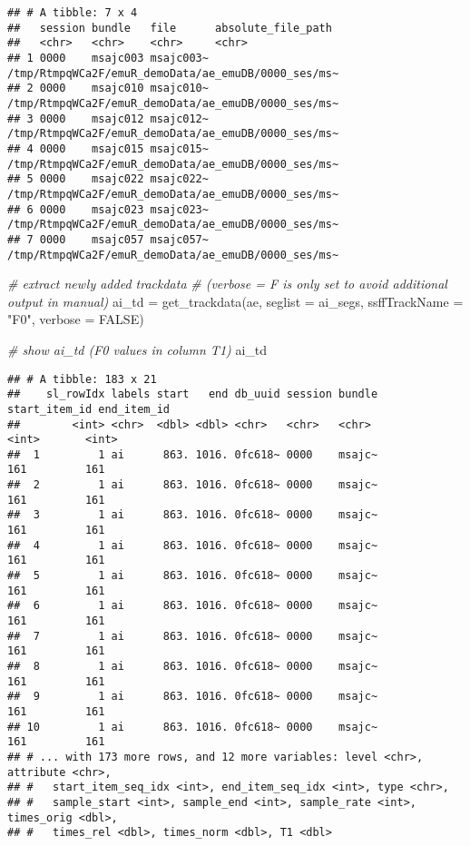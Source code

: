 \documentclass[
]{book}
\newenvironment{Shaded}{\begin{snugshade}}{\end{snugshade}}
\newcommand{\AttributeTok}[1]{\textcolor[rgb]{0.77,0.63,0.00}{#1}}
\newcommand{\CommentTok}[1]{\textcolor[rgb]{0.56,0.35,0.01}{\textit{#1}}}
\newcommand{\ConstantTok}[1]{\textcolor[rgb]{0.00,0.00,0.00}{#1}}
\newcommand{\FunctionTok}[1]{\textcolor[rgb]{0.00,0.00,0.00}{#1}}
\newcommand{\NormalTok}[1]{#1}
\newcommand{\OtherTok}[1]{\textcolor[rgb]{0.56,0.35,0.01}{#1}}
\newcommand{\StringTok}[1]{\textcolor[rgb]{0.31,0.60,0.02}{#1}}
\begin{document}
\begin{verbatim}
## # A tibble: 7 x 4
##   session bundle   file      absolute_file_path                                 
##   <chr>   <chr>    <chr>     <chr>                                              
## 1 0000    msajc003 msajc003~ /tmp/RtmpqWCa2F/emuR_demoData/ae_emuDB/0000_ses/ms~
## 2 0000    msajc010 msajc010~ /tmp/RtmpqWCa2F/emuR_demoData/ae_emuDB/0000_ses/ms~
## 3 0000    msajc012 msajc012~ /tmp/RtmpqWCa2F/emuR_demoData/ae_emuDB/0000_ses/ms~
## 4 0000    msajc015 msajc015~ /tmp/RtmpqWCa2F/emuR_demoData/ae_emuDB/0000_ses/ms~
## 5 0000    msajc022 msajc022~ /tmp/RtmpqWCa2F/emuR_demoData/ae_emuDB/0000_ses/ms~
## 6 0000    msajc023 msajc023~ /tmp/RtmpqWCa2F/emuR_demoData/ae_emuDB/0000_ses/ms~
## 7 0000    msajc057 msajc057~ /tmp/RtmpqWCa2F/emuR_demoData/ae_emuDB/0000_ses/ms~
\end{verbatim}

\begin{Shaded}
\begin{Highlighting}[]
\CommentTok{\# extract newly added trackdata}
\CommentTok{\# (verbose = F is only set to avoid additional output in manual)}
\NormalTok{ai\_td }\OtherTok{=} \FunctionTok{get\_trackdata}\NormalTok{(ae,}
                      \AttributeTok{seglist =}\NormalTok{ ai\_segs,}
                      \AttributeTok{ssffTrackName =} \StringTok{"F0"}\NormalTok{,}
                      \AttributeTok{verbose =} \ConstantTok{FALSE}\NormalTok{)}

\CommentTok{\# show ai\_td (F0 values in column T1)}
\NormalTok{ai\_td}
\end{Highlighting}
\end{Shaded}

\begin{verbatim}
## # A tibble: 183 x 21
##    sl_rowIdx labels start   end db_uuid session bundle start_item_id end_item_id
##        <int> <chr>  <dbl> <dbl> <chr>   <chr>   <chr>          <int>       <int>
##  1         1 ai      863. 1016. 0fc618~ 0000    msajc~           161         161
##  2         1 ai      863. 1016. 0fc618~ 0000    msajc~           161         161
##  3         1 ai      863. 1016. 0fc618~ 0000    msajc~           161         161
##  4         1 ai      863. 1016. 0fc618~ 0000    msajc~           161         161
##  5         1 ai      863. 1016. 0fc618~ 0000    msajc~           161         161
##  6         1 ai      863. 1016. 0fc618~ 0000    msajc~           161         161
##  7         1 ai      863. 1016. 0fc618~ 0000    msajc~           161         161
##  8         1 ai      863. 1016. 0fc618~ 0000    msajc~           161         161
##  9         1 ai      863. 1016. 0fc618~ 0000    msajc~           161         161
## 10         1 ai      863. 1016. 0fc618~ 0000    msajc~           161         161
## # ... with 173 more rows, and 12 more variables: level <chr>, attribute <chr>,
## #   start_item_seq_idx <int>, end_item_seq_idx <int>, type <chr>,
## #   sample_start <int>, sample_end <int>, sample_rate <int>, times_orig <dbl>,
## #   times_rel <dbl>, times_norm <dbl>, T1 <dbl>
\end{verbatim}
\end{document}
